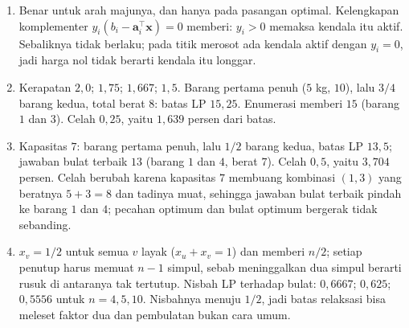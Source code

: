 \begin{enumerate}[label=\textbf{24.\arabic*}]
  \item Benar untuk arah majunya, dan hanya pada pasangan optimal. Kelengkapan
        komplementer $y_{i}(b_{i}-\mathbf{a}_{i}^{\top}\mathbf{x})=0$ memberi:
        $y_{i}>0$ memaksa kendala itu aktif. Sebaliknya tidak berlaku; pada titik
        merosot ada kendala aktif dengan $y_{i}=0$, jadi harga nol tidak berarti
        kendala itu longgar.

  \item Kerapatan $2{,}0$; $1{,}75$; $1{,}667$; $1{,}5$. Barang pertama penuh
        ($5$ kg, $10$), lalu $3/4$ barang kedua, total berat $8$: batas LP
        $15{,}25$. Enumerasi memberi $15$ (barang $1$ dan $3$). Celah $0{,}25$,
        yaitu $1{,}639$ persen dari batas.

  \item 
Kapasitas $7$: barang pertama penuh, lalu $1/2$ barang kedua, batas LP
        $13{,}5$; jawaban bulat terbaik $13$ (barang $1$ dan $4$, berat $7$). Celah
        $0{,}5$, yaitu $3{,}704$ persen. Celah berubah karena kapasitas $7$ membuang
        kombinasi $(1,3)$ yang beratnya $5+3=8$ dan tadinya muat, sehingga jawaban
        bulat terbaik pindah ke barang $1$ dan $4$; pecahan optimum dan bulat
        optimum bergerak tidak sebanding.

  \item $x_{v}=1/2$ untuk semua $v$ layak ($x_{u}+x_{v}=1$) dan memberi $n/2$;
        setiap penutup harus memuat $n-1$ simpul, sebab meninggalkan dua simpul
        berarti rusuk di antaranya tak tertutup. Nisbah LP terhadap bulat:
        $0{,}6667$; $0{,}625$; $0{,}5556$ untuk $n=4,5,10$. Nisbahnya menuju
        $1/2$, jadi batas relaksasi bisa meleset faktor dua dan pembulatan bukan
        cara umum.
\end{enumerate}

